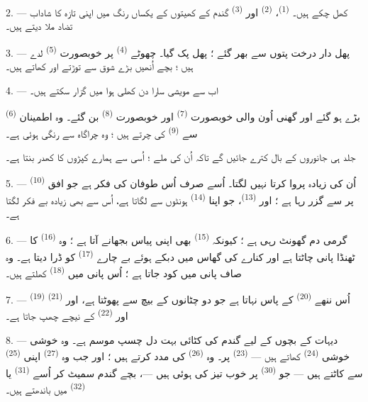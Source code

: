2. ---  کھل چکے ہیں۔ 
\textsuperscript{(1)}، 
\textsuperscript{(2)} اور  \textsuperscript{(3)}
گندم کے کھیتوں کے یکساں رنگ میں اپنی تازہ  کا
شاداب تضاد ملا دیتے ہیں۔

3. --- پھل دار درخت پتوں سے بھر گئے ؛ پھل پک گیا۔ چھوٹے
 \textsuperscript{(4)} پر خوبصورت 
\textsuperscript{(5)} لدے ہیں ؛ بچے اُنھیں بڑے شوق سے توڑتے اور کھاتے
ہیں۔

4. --- اب سے مویشی سارا دن کھلی ہوا میں گزار سکتے ہیں۔

 \textsuperscript{(6)} بڑے ہو گئے اور گھنی اُون والی
خوبصورت  \textsuperscript{(7)} اور خوبصورت
 \textsuperscript{(8)} بن گئے۔ وہ اطمینان سے
 \textsuperscript{(9)} کی  چرتے ہیں ؛ وہ
چراگاہ  سے رنگی ہوئی ہے۔

جلد ہی  جانوروں کے بال کترے جائیں گے تاکہ اُن کی
 ملے ؛ اُسی سے ہمارے کپڑوں کا کھدر بنتا ہے۔

\VUsaut{5.0mm}
\VUsaut{3.4mm}

5. ---  \textsuperscript{(10)} اُن کی زیادہ پروا کرتا نہیں
لگتا۔ اُسے صرف اُس طوفان کی فکر ہے جو افق پر سے گزر رہا ہے ؛ اور
 \textsuperscript{(13)}، جو اپنا
 \textsuperscript{(14)} ہونٹوں سے لگاتا ہے، اُس سے بھی
زیادہ بے فکر لگتا ہے۔

6. --- گرمی دم گھونٹ رہی ہے ؛ کیونکہ  \textsuperscript{(15)}
بھی اپنی پیاس بجھانے آتا ہے ؛ وہ  \textsuperscript{(16)} کا
ٹھنڈا پانی چاٹتا ہے اور کنارے کی گھاس میں دبکے ہوئے بے چارے
 \textsuperscript{(17)} کو ڈرا دیتا ہے۔ وہ صاف پانی
میں کود جاتا ہے ؛ اُس پانی میں  \textsuperscript{(18)}
کھلتے ہیں۔

7. ---  \textsuperscript{(19)} اُس ننھے 
\textsuperscript{(20)} کے پاس نہاتا ہے جو دو چٹانوں کے بیچ سے پھوٹتا
ہے، اور  \textsuperscript{(21)} اور
 \textsuperscript{(22)} کے نیچے چھپ جاتا ہے۔

\VUsaut{5.0mm}
\VUsaut{3.4mm}

8. --- دیہات کے بچوں کے لیے گندم کی کٹائی بہت دل چسپ موسم ہے۔ وہ
خوشی خوشی  \textsuperscript{(24)} کھاتے ہیں —
 \textsuperscript{(23)} پر۔ وہ  \textsuperscript{(26)} کی مدد کرتے ہیں ؛ اور جب وہ
 \textsuperscript{(27)} اپنی  \textsuperscript{(25)} سے کاٹتے ہیں — جو 
\textsuperscript{(30)} پر خوب تیز کی ہوئی ہیں —، بچے گندم سمیٹ کر اُسے
 \textsuperscript{(31)} یا 
\textsuperscript{(32)} میں باندھتے ہیں۔

